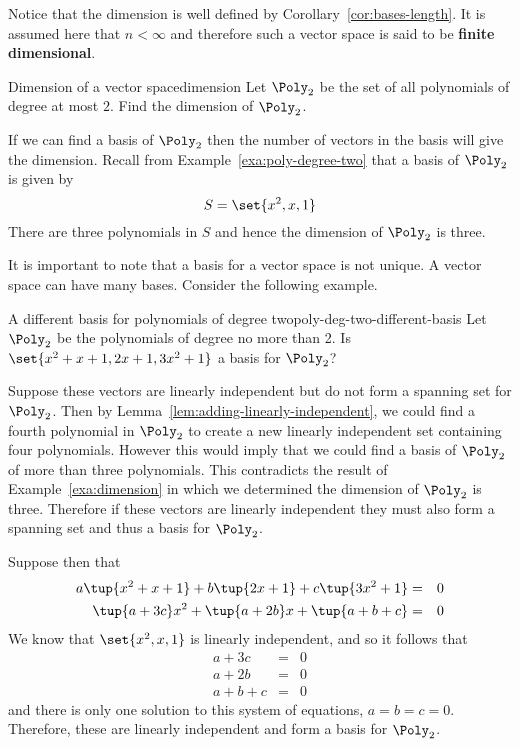 Notice that the dimension is well defined by Corollary~\ref{cor:bases-length}. It is assumed here
that $n<\infty $ and therefore such a vector space is said to be \textbf{finite
dimensional}.

\begin{example}{Dimension of a vector space}{dimension}
Let $\Poly_2$ be the set of all polynomials of degree at most $2$. Find the dimension of $\Poly_2$. 
\end{example}

\begin{solution}
If we can find a basis of $\Poly_2$ then the number of vectors in the basis will give the dimension. Recall from Example~\ref{exa:poly-degree-two} that a basis of $\Poly_2$ is given by 
\[
S  = \set{x^2, x, 1 }
\]
There are three polynomials in $S$ and hence the dimension of $\Poly_2$ is three. 
\end{solution}

It is important to note that a basis for a vector space is not unique. A vector space can have many bases. Consider the following example.

\begin{example}{A different basis for polynomials of degree two}{poly-deg-two-different-basis}
Let $\Poly_2$ be the polynomials of degree no more than 2. Is $\set{
x^{2}+x+1,2x+1,3x^{2}+1} $ a basis for $\Poly_2$?
\end{example}

\begin{solution}
Suppose these vectors are linearly independent but do not form a spanning set for $\Poly_2$. Then by Lemma~\ref{lem:adding-linearly-independent}, we could find a fourth polynomial in $\Poly_2$ to create a new linearly independent 
set containing four polynomials. However this would imply that we could find a basis of $\Poly_2$ of more than three polynomials. This contradicts the result of Example~\ref{exa:dimension} in which we determined the dimension of $\Poly_2$ is three.  Therefore if these vectors are linearly independent they must also form a spanning set and thus a basis for $\Poly_2$. 

Suppose then that 
\begin{eqnarray*}
a\tup{x^{2}+x+1} +b\tup{2x+1} +c\tup{3x^{2}+1} &=& 0\\
\tup{a+3c} x^{2}+\tup{a+2b} x+\tup{a+b+c} &=& 0 
\end{eqnarray*}
We know that $\set{x^2, x, 1 }$ is linearly independent, and so it follows that  
\begin{eqnarray*}
a+3c &=& 0 \\
a+2b &=& 0 \\
a+b+c &=& 0
\end{eqnarray*}
and there is only one solution to this system of equations, $a=b=c=0$.
Therefore, these are linearly independent and form a basis for $\Poly_2$.
\end{solution}

